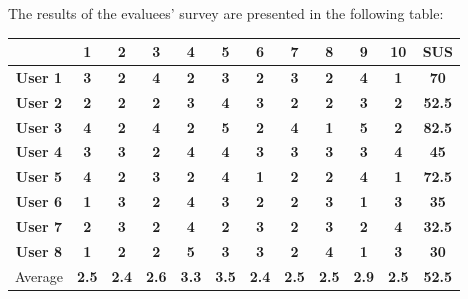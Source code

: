 \documentclass[12pt,a4paper]{report}
\begin{document}
	The results of the evaluees' survey are presented in the following table:
	\begin{center}
		\begin{tabular}{ c | c | c | c | c | c | c | c | c | c | c | c } 
							 & 1 & 2 & 3 & 4 & 5 & 6 & 7 & 8 & 9 & 10 & \textbf{SUS} \\
							 \hline\hline
\textbf{User 1} & \textbf{3} & \textbf{2} & \textbf{4} & \textbf{2} & \textbf{3} & \textbf{2} & \textbf{3} & \textbf{2} & \textbf{4} & \textbf{1} & \textbf{70} \\
\textbf{User 2} & \textbf{2} & \textbf{2} & \textbf{2} & \textbf{3} & \textbf{4} & \textbf{3} & \textbf{2} & \textbf{2} & \textbf{3} & \textbf{2} & \textbf{52.5} \\
\textbf{User 3} & \textbf{4} & \textbf{2} & \textbf{4} & \textbf{2} & \textbf{5} & \textbf{2} & \textbf{4} & \textbf{1} & \textbf{5} & \textbf{2} & \textbf{82.5} \\
\textbf{User 4} & \textbf{3} & \textbf{3} & \textbf{2} & \textbf{4} & \textbf{4} & \textbf{3} & \textbf{3} & \textbf{3} & \textbf{3} & \textbf{4} & \textbf{45} \\
\textbf{User 5} & \textbf{4} & \textbf{2} & \textbf{3} & \textbf{2} & \textbf{4} & \textbf{1} & \textbf{2} & \textbf{2} & \textbf{4} & \textbf{1} & \textbf{72.5} \\
\textbf{User 6} & \textbf{1} & \textbf{3} & \textbf{2} & \textbf{4} & \textbf{3} & \textbf{2} & \textbf{2} & \textbf{3} & \textbf{1} & \textbf{3} & \textbf{35} \\
\textbf{User 7} & \textbf{2} & \textbf{3} & \textbf{2} & \textbf{4} & \textbf{2} & \textbf{3} & \textbf{2} & \textbf{3} & \textbf{2} & \textbf{4} & \textbf{32.5} \\
\textbf{User 8} & \textbf{1} & \textbf{2} & \textbf{2} & \textbf{5} & \textbf{3} & \textbf{3} & \textbf{2} & \textbf{4} & \textbf{1} & \textbf{3} & \textbf{30} \\
\hline
Average & \textbf{2.5} & \textbf{2.4} & \textbf{2.6} & \textbf{3.3} & \textbf{3.5} & \textbf{2.4} & \textbf{2.5} & \textbf{2.5} & \textbf{2.9} & \textbf{2.5} & \textbf{52.5} \\
\end{tabular}
\end{center}
\end{document}
